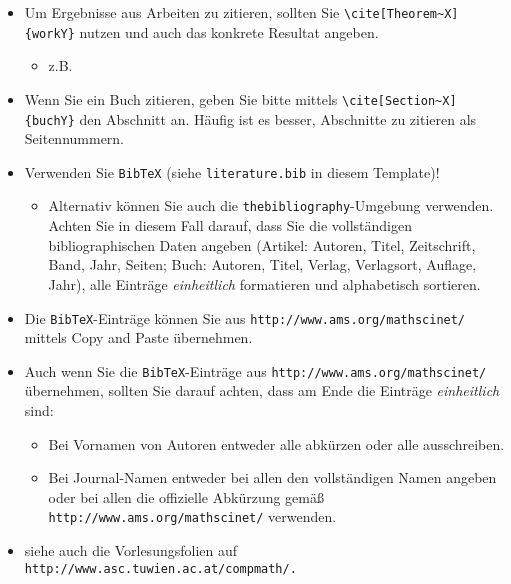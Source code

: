 {\color{change}
\begin{itemize}
\item Um Ergebnisse aus Arbeiten zu zitieren, sollten Sie \verb$\cite[Theorem~X]{workY}$ nutzen und auch das konkrete Resultat angeben.
\begin{itemize}
\item z.B.\ \cite[Theorem~4]{GraphsNetworks}
\end{itemize}

\item Wenn Sie ein Buch zitieren, geben Sie bitte mittels \verb$\cite[Section~X]{buchY}$
den Abschnitt an. Häufig ist es besser, Abschnitte zu zitieren als Seitennummern.

\item Verwenden Sie \verb$BibTeX$ (siehe \verb$literature.bib$ in diesem Template)!
\begin{itemize}
\item Alternativ können Sie auch die \verb$thebibliography$-Umgebung verwenden. Achten Sie in diesem Fall darauf, dass Sie die vollständigen bibliographischen Daten angeben (Artikel: Autoren, Titel, Zeitschrift, Band, Jahr, Seiten; Buch: Autoren, Titel, Verlag, Verlagsort, Auflage, Jahr), alle Einträge \emph{einheitlich} formatieren und alphabetisch sortieren. 
\end{itemize}

\item Die \verb$BibTeX$-Einträge können Sie aus \verb$http://www.ams.org/mathscinet/$ mittels Copy and Paste überneh\-men.
\item Auch wenn Sie die \verb$BibTeX$-Einträge aus \verb$http://www.ams.org/mathscinet/$ über\-neh\-men, sollten Sie darauf achten, dass am Ende die Einträge \emph{einheitlich} sind:
\begin{itemize}
\item Bei Vornamen von Autoren entweder alle abkürzen oder alle ausschreiben. 
\item Bei Journal-Namen entweder bei allen den vollständigen Namen angeben oder
bei allen die offizielle Abkürzung gemäß \verb$http://www.ams.org/mathscinet/$ verwenden.
\end{itemize}

\item siehe auch die Vorlesungsfolien auf \verb$http://www.asc.tuwien.ac.at/compmath/.$

\end{itemize}
}

